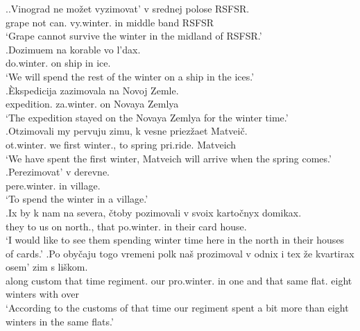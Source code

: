 \ex.\label{ex:zimovat'}\ag.\label{ex:vyzimovat'}Vinograd ne mo\v{z}et vyzimovat' v srednej polose RSFSR.\\
grape not can. vy.winter. in middle band RSFSR\\
\trans `Grape cannot survive the winter in the midland of RSFSR.'\\
\bg.\label{ex:dozimovat'}Dozimuem na korable vo l'dax.\\
do.winter. on ship in ice.\\
\trans `We will spend the rest of the winter on a ship in the ices.'\\
\bg.\label{ex:zazimovat'}\`{E}kspedicija zazimovala na Novoj Zemle.\\
expedition. za.winter. on Novaya Zemlya\\
\trans `The expedition stayed on the Novaya Zemlya for the winter time.'\\
\bg.\label{ex:otzimovat'}Otzimovali my pervuju zimu, k vesne priez\v{z}aet Matvei\v{c}.\\
ot.winter. we first winter., to spring pri.ride. Matveich\\
\trans `We have spent the first winter, Matveich will arrive when the spring comes.'
\bg.\label{ex:perezimovat'}Perezimovat' v derevne.\\
pere.winter. in village.\\
\trans `To spend the winter in a village.'\\
\bg.\label{ex:pozimovat'}Ix by k nam na severa, \v{c}toby pozimovali v svoix karto\v{c}nyx domikax.\\
they {} to us on north., that po.winter. in their card house.\\
\trans `I would like to see them spending winter time here in the north in their houses of cards.'
\bg.\label{ex:prozimovat'}Po oby\v{c}aju togo vremeni polk na\v{s} prozimoval v odnix i tex \v{z}e kvartirax osem' zim s li\v{s}kom.\\
along custom that time regiment. our pro.winter. in one and that same flat. eight winters with over\\
\trans `According to the customs of that time our regiment spent a bit more than eight winters in the same flats.'\\

